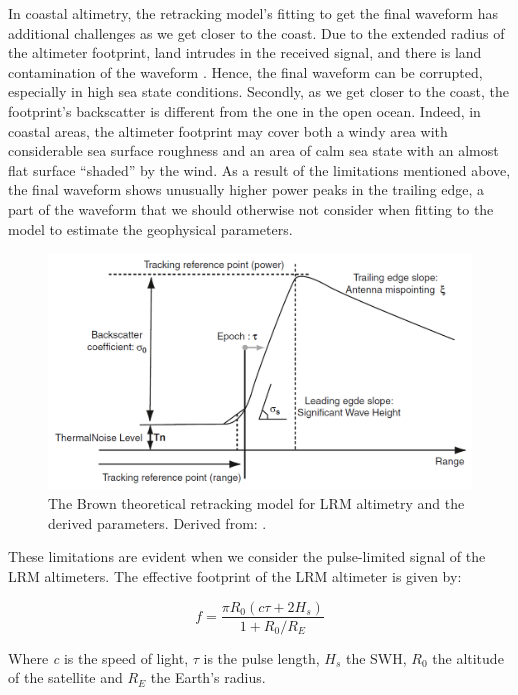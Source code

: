 In coastal altimetry, the retracking model's fitting to get the final waveform has additional challenges as we get closer to the coast. Due to the extended radius of the altimeter footprint, land intrudes in the received signal, and there is land contamination of the waveform \citep{Halimi2013}. Hence, the final waveform can be corrupted, especially in high sea state conditions. Secondly, as we get closer to the coast, the footprint's backscatter is different from the one in the open ocean. Indeed, in coastal areas, the altimeter footprint may cover both a windy area with considerable sea surface roughness and an area of calm sea state with an almost flat surface “shaded” by the wind. As a result of the limitations mentioned above, the final waveform shows unusually higher power peaks in the trailing edge, a part of the waveform that we should otherwise not consider when fitting to the model to estimate the geophysical parameters.


\begin{figure}[H]
\centering
\includegraphics[width=0.85\linewidth]{Figures/Chapter2/altimeter_waveform.png}
\caption{The Brown theoretical retracking model for LRM altimetry and the derived parameters. Derived from: \cite{Gommenginger2011}.}
\label{fig:altimeter_waveform}
\end{figure}



These limitations are evident when we consider the pulse-limited signal of the LRM altimeters. The effective footprint of the LRM altimeter is given by:

\begin{equation}
f = \frac{\pi R_{0} (c\tau + 2 H_{s})}{1 + R_{0}/R_{E}}
\label{eqn:effective_footprint}
\end{equation}

Where \emph{c} is the speed of light, \emph{$\tau$} is the pulse length, $H_{s}$ the SWH, $R_{0}$ the altitude of the satellite and $R_{E}$ the Earth's radius.

